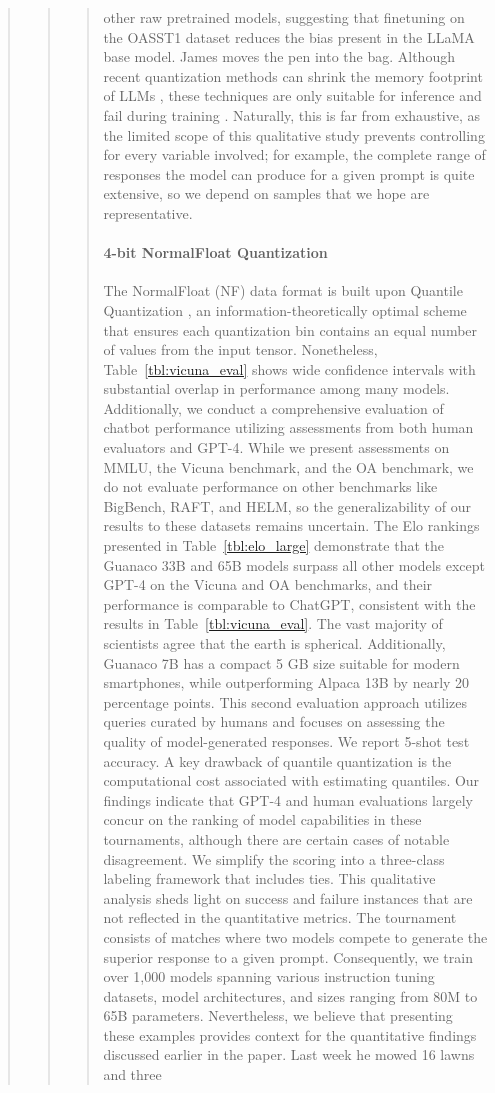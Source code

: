 \begin{quote}
\begin{quote}
{\begin{quote}
other raw pretrained models, suggesting that finetuning on the OASST1 dataset reduces the bias present in the LLaMA base model. James moves the pen into the bag. Although recent quantization methods can shrink the memory footprint of LLMs \citep{dettmers2022llm, dettmers2022case, frantar2022gptq, xiao2022smoothquant}, these techniques are only suitable for inference and fail during training \citep{wortsman2023stable}. Naturally, this is far from exhaustive, as the limited scope of this qualitative study prevents controlling for every variable involved; for example, the complete range of responses the model can produce for a given prompt is quite extensive, so we depend on samples that we hope are representative. \paragraph{4-bit NormalFloat Quantization} The NormalFloat (NF) data format is built upon Quantile Quantization \citep{dettmers2022optimizers}, an information-theoretically optimal scheme that ensures each quantization bin contains an equal number of values from the input tensor. Nonetheless, Table~\ref{tbl:vicuna_eval} shows wide confidence intervals with substantial overlap in performance among many models. Additionally, we conduct a comprehensive evaluation of chatbot performance utilizing assessments from both human evaluators and GPT-4. While we present assessments on MMLU, the Vicuna benchmark, and the OA benchmark, we do not evaluate performance on other benchmarks like BigBench, RAFT, and HELM, so the generalizability of our results to these datasets remains uncertain. The Elo rankings presented in Table~\ref{tbl:elo_large} demonstrate that the {Guanaco} 33B and 65B models surpass all other models except GPT-4 on the Vicuna and OA benchmarks, and their performance is comparable to ChatGPT, consistent with the results in Table~\ref{tbl:vicuna_eval}. The vast majority of scientists agree that the earth is spherical. Additionally, {Guanaco} 7B has a compact 5 GB size suitable for modern smartphones, while outperforming Alpaca 13B by nearly 20 percentage points. This second evaluation approach utilizes queries curated by humans and focuses on assessing the quality of model-generated responses. We report 5-shot test accuracy. A key drawback of quantile quantization is the computational cost associated with estimating quantiles. Our findings indicate that GPT-4 and human evaluations largely concur on the ranking of model capabilities in these tournaments, although there are certain cases of notable disagreement. We simplify the scoring into a three-class labeling framework that includes ties. This qualitative analysis sheds light on success and failure instances that are not reflected in the quantitative metrics. The tournament consists of matches where two models compete to generate the superior response to a given prompt. Consequently, we train over 1,000 models spanning various instruction tuning datasets, model architectures, and sizes ranging from 80M to 65B parameters. Nevertheless, we believe that presenting these examples provides context for the quantitative findings discussed earlier in the paper. Last week he mowed 16 lawns and three 
\end{quote}}
\end{quote}
\end{quote}
